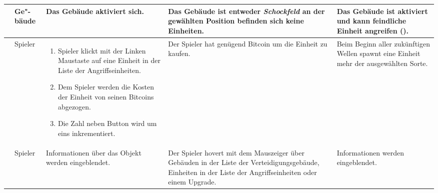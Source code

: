 \begin{longtabu}{X[0.6L]X[0.4L]X[L]X[L]X[L]}
    & Ge"-bäude
    & Das Gebäude aktiviert sich.
    & Das Gebäude ist entweder \emph{Schockfeld} \textbf{} an der
      gewählten Position befinden sich keine Einheiten.
    & Das Gebäude ist aktiviert und kann feindliche Einheit angreifen
      ().
  \\\midrule

    & Spieler
    & \vspace*{-0.2cm}\begin{enumerate}[nosep,leftmargin=*]
        \item Spieler klickt mit der Linken Maustaste auf eine Einheit in der
          Liste der Angriffseinheiten.
        \item Dem Spieler werden die Kosten der Einheit von seinen Bitcoins
          abgezogen.
        \item Die Zahl neben Button wird um eins inkrementiert.
      \end{enumerate}
    & Der Spieler hat genügend Bitcoin um die Einheit zu kaufen.
    & Beim Beginn aller zukünftigen Wellen spawnt eine Einheit mehr der
      ausgewählten Sorte.
  \\\midrule

    & Spieler
    & Informationen über das Objekt werden eingeblendet.
    & Der Spieler hovert mit dem Mauszeiger über Gebäuden in der Liste der
      Verteidigungsgebäude, Einheiten in der Liste der Angriffseinheiten oder
      einem Upgrade.
    & Informationen werden eingeblendet.

  \\\bottomrule
\end{longtabu}
\endgroup



